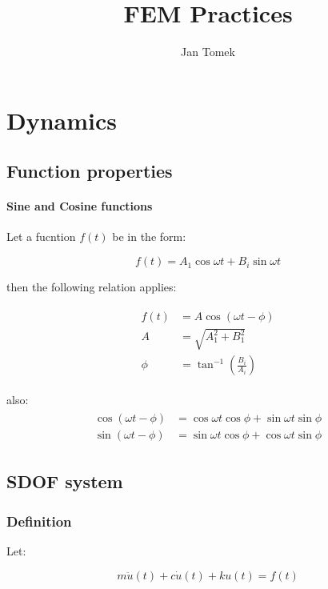 \documentclass[10pt,b5paper,titlepage]{book}
\author{Jan Tomek}
\title{\bf FEM Practices}
\newenvironment{eqarray}
{
    \begin{eqnarray}
        \begin{aligned}
}
{
        \end{aligned}
    \end{eqnarray}
}
\begin{document}
\maketitle

\tableofcontents

\chapter{Dynamics}

\section{Function properties}

\subsubsection{Sine and Cosine functions}
Let a fucntion $ f(t) $ be in the form:

\begin{equation}
    f(t) = A_1 \cos{\omega t} + B_i \sin{\omega t}
\end{equation}

then the following relation applies:

\begin{eqarray}
    f(t) &= A \cos{\left( \omega t - \phi \right)}\\
    A &= \sqrt{A_1^2 + B_1^2}\\
    \phi &= \tan^{-1} \left( \frac{B_i}{A_i} \right)
\end{eqarray}

also:
\begin{eqarray}
    \cos{\left( \omega t - \phi \right)} &=
    \cos{\omega t} \cos{\phi} + \sin{\omega t} \sin{\phi}\\
    \sin{\left( \omega t - \phi \right)} &=
    \sin{\omega t} \cos{\phi} + \cos{\omega t} \sin{\phi}
\end{eqarray}



\section{SDOF system}

\subsection{Definition}

Let:

\begin{equation}
    m \ddot{u}(t) + c \dot{u}(t) + k u(t) = f(t)
\end{equation}
\end{document}
